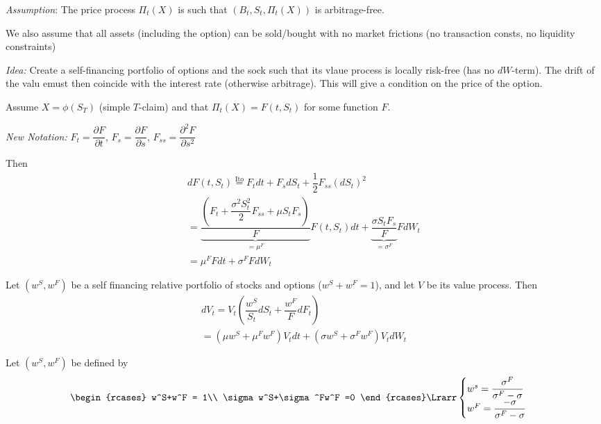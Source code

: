 \par\bigskip
\noindent\textit{Assumption}: The price process $\Pi_t(X)$ is such that $(B_t,S_t,\Pi_t(X))$ is arbitrage-free.\par
\noindent We also assume that all assets (including the option) can be sold/bought with no market frictions (no transaction consts, no liquidity constraints)
\par\bigskip
\noindent\textit{Idea:} Create a self-financing portfolio of options and the sock such that its vlaue process is locally risk-free (has no $dW$-term). The drift of the valu emust then coincide with the interest rate (otherwise arbitrage). This will give a condition on the price of the option.
\par\bigskip
\noindent Assume $X = \phi(S_T)$ (simple $T$-claim) and that $\Pi_t(X)=F(t,S_t)$ for some function $F$.\par
\noindent\textit{New Notation:} $F_t = \dfrac{\partial F}{\partial t}$, $F_s = \dfrac{\partial F}{\partial s}$, $F_{ss} = \dfrac{\partial^2F}{\partial s^2}$
\par\bigskip
\noindent Then
\begin{equation*}
  \begin{gathered}
    dF(t,S_t)\stackrel{\text{Ito}}{=} F_tdt+F_sdS_t+\dfrac{1}{2}F_{ss}(dS_t)^2\\
    = \underbrace{\dfrac{\left(F_t+\dfrac{\sigma^2 S_t^2}{2}F_{ss}+\mu S_tF_s\right)}{F}}_{=\mu^F}F(t,S_t)dt+\underbrace{\dfrac{\sigma S_t F_s}{F}}_{=\sigma^F}FdW_t\\
    = \mu^FFdt+\sigma^FFdW_t
  \end{gathered}
\end{equation*}
\par\bigskip
\noindent Let $(w^S,w^F)$ be a self financing relative portfolio of stocks and options ($w^S+w^F = 1$), and let $V$ be its value process. Then
\begin{equation*}
  \begin{gathered}
    dV_t = V_t\left(\dfrac{w^S}{S_t}dS_t+\dfrac{w^F}{F}dF_t\right)\\
    = \left(\mu w^S+\mu^Fw^F\right)V_tdt + (\sigma w^S+\sigma^F w^F)V_t dW_t
  \end{gathered}
\end{equation*}\par
\noindent Let $(w^S,w^F)$ be defined by
\begin{equation*}
  \begin{gathered}
    \begin{rcases}
      w^S+w^F = 1\\
      \sigma w^S+\sigma^Fw^F =0
      \end{rcases}\Lrarr\begin{cases}
      w^s = \dfrac{\sigma^F}{\sigma^F-\sigma}\\
      w^F = \dfrac{-\sigma}{\sigma^F -\sigma}
    \end{cases}
  \end{gathered}
\end{equation*}
